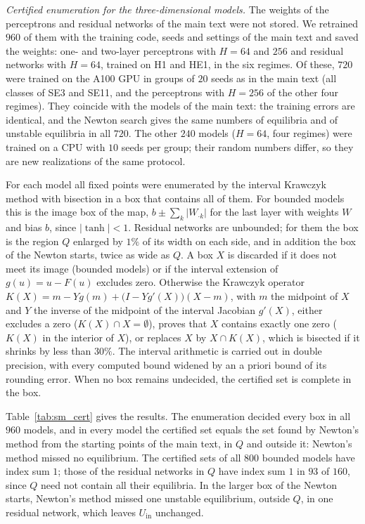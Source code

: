\documentclass[aip,cha,preprint,amsmath,amssymb,longbibliography]{revtex4-2}
\newcommand{\Uin}{U_{\mathrm{in}}}
\begin{document}
\emph{Certified enumeration for the three-dimensional models.} The weights of the perceptrons and residual networks of the
main text were not stored. We retrained $960$ of them with the training code, seeds and settings of the main text and saved
the weights: one- and two-layer perceptrons with $H=64$ and $256$ and residual networks with $H=64$, trained on H1 and HE1,
in the six regimes. Of these, $720$ were trained on the A100 GPU in groups of $20$ seeds as in the main text (all classes of
SE3 and SE11, and the perceptrons with $H=256$ of the other four regimes). They coincide with the models of the main text:
the training errors are identical, and the Newton search gives the same numbers of equilibria and of unstable equilibria in
all $720$. The other $240$ models ($H=64$, four regimes) were trained on a CPU with $10$ seeds per group; their random numbers
differ, so they are new realizations of the same protocol.

For each model all fixed points were enumerated by the interval Krawczyk method with
bisection\cite{Krawczyk1969Newton,Moore2009Interval} in a box that contains all of them. For bounded models this is the
image box of the map, $b\pm\sum_k|W_{\cdot k}|$ for the last layer with weights $W$ and bias $b$, since $|\tanh|<1$.
Residual networks are unbounded; for them the box is the region $Q$ enlarged by $1\%$ of its width on each side, and in
addition the box of the Newton starts, twice as wide as $Q$. A box $X$ is discarded if it does not meet its image (bounded
models) or if the interval extension of $g(u)=u-F(u)$ excludes zero. Otherwise the Krawczyk operator
$K(X)=m-Yg(m)+\bigl(I-Yg'(X)\bigr)(X-m)$, with $m$ the midpoint of $X$ and $Y$ the inverse of the midpoint of the interval
Jacobian $g'(X)$, either excludes a zero ($K(X)\cap X=\emptyset$), proves that $X$ contains exactly one zero ($K(X)$ in the
interior of $X$), or replaces $X$ by $X\cap K(X)$, which is bisected if it shrinks by less than $30\%$. The interval
arithmetic is carried out in double precision, with every computed bound widened by an a priori bound of its rounding error.
When no box remains undecided, the certified set is complete in the box.

Table~\ref{tab:sm_cert} gives the results. The enumeration decided every box in all $960$ models, and in every model the
certified set equals the set found by Newton's method from the starting points of the main text, in $Q$ and outside it:
Newton's method missed no equilibrium. The certified sets of all $800$ bounded models have index sum $1$; those of the
residual networks in $Q$ have index sum $1$ in $93$ of $160$, since $Q$ need not contain all their equilibria. In the larger
box of the Newton starts, Newton's method missed one unstable equilibrium, outside $Q$, in one residual network, which
leaves $\Uin$ unchanged.
\end{document}
